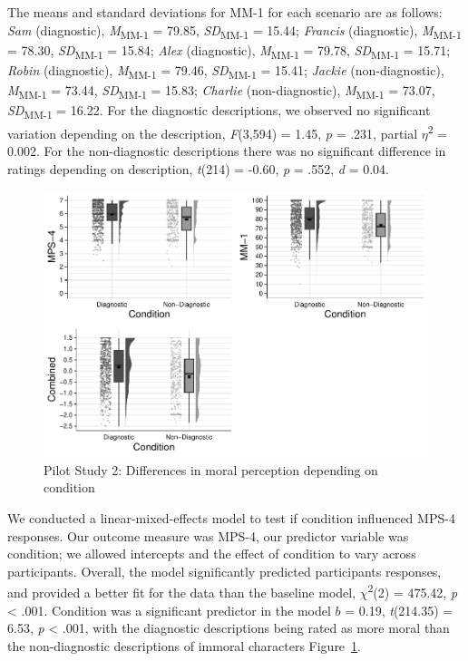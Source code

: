 \documentclass[
  man,floatsintext]{apa6}
\begin{document}
The means and standard deviations for MM-1 for each scenario are as follows:
\emph{Sam} (diagnostic),
\emph{M}\textsubscript{MM-1} = 79.85, \emph{SD}\textsubscript{MM-1} = 15.44;
\emph{Francis} (diagnostic),
\emph{M}\textsubscript{MM-1} = 78.30, \emph{SD}\textsubscript{MM-1} = 15.84;
\emph{Alex} (diagnostic),
\emph{M}\textsubscript{MM-1} = 79.78, \emph{SD}\textsubscript{MM-1} = 15.71;
\emph{Robin} (diagnostic),
\emph{M}\textsubscript{MM-1} = 79.46, \emph{SD}\textsubscript{MM-1} = 15.41;
\emph{Jackie} (non-diagnostic),
\emph{M}\textsubscript{MM-1} = 73.44, \emph{SD}\textsubscript{MM-1} = 15.83;
\emph{Charlie} (non-diagnostic),
\emph{M}\textsubscript{MM-1} = 73.07, \emph{SD}\textsubscript{MM-1} = 16.22. For the diagnostic descriptions, we observed no significant variation depending on the description, \emph{F}(3,594) = 1.45, \emph{p} = .231, partial \(\eta\)\textsuperscript{2} = 0.002. For the non-diagnostic descriptions there was no significant difference in ratings depending on description, \emph{t}(214) = -0.60, \emph{p} = .552, \emph{d} = 0.04.

\begin{figure}[!h]
\includegraphics[width=\textwidth,]{Supplementary_files/figure-latex/pilot2bothconditionplot-1} \caption{Pilot Study 2: Differences in moral perception depending on condition}\label{fig:pilot2bothconditionplot}
\end{figure}

We conducted a linear-mixed-effects model to test if condition influenced MPS-4 responses. Our outcome measure was MPS-4, our predictor variable was condition; we allowed intercepts and the effect of condition to vary across participants.
Overall, the model significantly predicted participants responses, and provided a better fit for the data than the baseline model, \(\chi\)\textsuperscript{2}(2) = 475.42, \emph{p} \textless{} .001. Condition was a significant predictor in the model \(b\) = 0.19, \emph{t}(214.35) = 6.53, \emph{p} \textless{} .001, with the diagnostic descriptions being rated as more moral than the non-diagnostic descriptions of immoral characters Figure~\ref{fig:pilot2bothconditionplot}.
\end{document}
